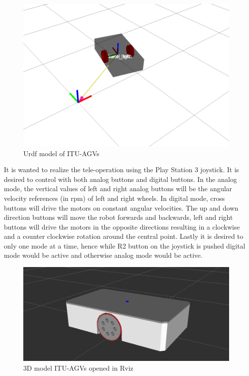 		\begin{figure}[h]
			\centering
			\includegraphics[scale=0.55]{images/agv-urdf}
			\caption{Urdf model of ITU-AGVs}
			\label{fig:agv-urdf}
		\end{figure}
		\par
		It is wanted to realize the tele-operation using the Play Station 3 joystick. It is desired to control with both analog buttons and digital buttons. In the analog mode, the vertical values of left and right analog buttons will be the angular velocity references (in rpm) of left and right wheels. In digital mode, cross buttons will drive the motors on constant angular velocities. The up and down direction buttons will move the robot forwards and backwards, left and right buttons will drive the motors in the opposite directions resulting in a clockwise and a counter clockwise rotation around the central point. Lastly it is desired to only one mode at a time, hence while R2 button on the joystick is pushed digital mode would be active and otherwise analog mode would be active. 
		\par
		\begin{figure}[h]
			\centering
			\includegraphics[scale=0.5]{images/agv-dae}
			\caption{3D model ITU-AGVs opened in Rviz}
			\label{fig:agv-dae}
		\end{figure}		
